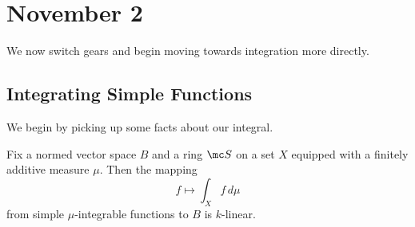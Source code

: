 \documentclass[../notes.tex]{subfiles}
\begin{document}
\section{November 2}

We now switch gears and begin moving towards integration more directly.

\subsection{Integrating Simple Functions}
We begin by picking up some facts about our integral.
\begin{lemma} \label{lem:simple-int-is-linear}
	Fix a normed vector space $B$ and a ring $\mc S$ on a set $X$ equipped with a finitely additive measure $\mu$. Then the mapping
	\[f\mapsto\int_Xf\,d\mu\]
	from simple $\mu$-integrable functions to $B$ is $k$-linear.
\end{lemma}
\end{document}
